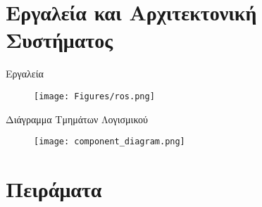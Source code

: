 \documentclass[10pt, compress]{beamer}
\begin{document}
\section{Εργαλεία και Αρχιτεκτονική Συστήματος}

\begin{frame}{Εργαλεία}
	\begin{figure}
		\texttt{[image: Figures/ros.png]}\\[0.5cm]
	\end{figure}
\end{frame}

\begin{frame}{Διάγραμμα Τμημάτων Λογισμικού}
	\begin{figure}
		\texttt{[image: component\_diagram.png]}
	\end{figure}
\end{frame}

\section{Πειράματα}
\end{document}
